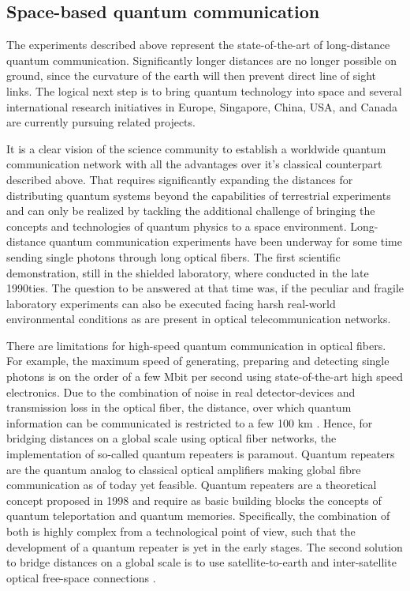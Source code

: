 \documentclass{article}
\begin{document}
\subsection{Space-based quantum communication}
The experiments described above represent the state-of-the-art of long-distance quantum communication. Significantly longer distances are no longer possible on ground, since the curvature of the earth will then prevent direct line of sight links. The logical next step is to bring quantum technology into space and several international research initiatives in Europe, Singapore, China, USA, and Canada are currently pursuing related projects. 

It is a clear vision of the science community to establish a worldwide quantum communication network with all the advantages over it's classical counterpart described above. That requires significantly expanding the distances for distributing quantum systems beyond the capabilities of terrestrial experiments and can only be realized by tackling the additional challenge of bringing the concepts and technologies of quantum physics to a space environment. Long-distance quantum communication experiments have been underway for some time sending single photons through long optical fibers. The first scientific demonstration, still in the shielded laboratory, where conducted in the late 1990ties. The question to be answered at that time was, if the peculiar and fragile laboratory experiments can also be executed facing harsh real-world environmental conditions as are present in optical telecommunication networks.

There are limitations for high-speed quantum communication in optical fibers. For example, the maximum speed of generating, preparing and detecting single photons is on the order of a few Mbit per second using state-of-the-art high speed electronics. Due to the combination of noise in real detector-devices and transmission loss in the optical fiber, the distance, over which quantum information can be communicated is restricted to a few 100 km \cite{waks2002security}. Hence, for bridging distances on a global scale using optical fiber networks, the implementation of so-called quantum repeaters is paramout. Quantum repeaters are the quantum analog to classical optical amplifiers making global fibre communication as of today yet feasible. Quantum repeaters are a theoretical concept proposed in 1998 \cite{briegel1998quantum} and require as basic building blocks the concepts of quantum teleportation and quantum memories. Specifically, the combination of both is highly complex from a technological point of view, such that the development of a quantum repeater is yet in the early stages. The second solution to bridge distances on a global scale is to use satellite-to-earth and inter-satellite optical free-space connections \cite{ursin2007entanglement}. 
\end{document}
